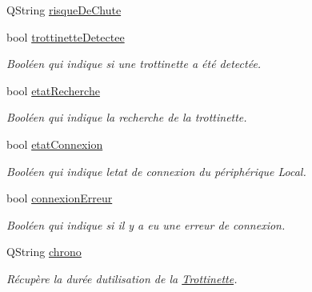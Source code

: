 \begin{DoxyCompactItemize}
Q\+String \hyperlink{class_peripherique_local_a79a43778c2db1c9c70784b6329dc383e}{risque\+De\+Chute}
\item 
bool \hyperlink{class_peripherique_local_af6f664b6af67f1c90eb017391ac812ed}{trottinette\+Detectee}
\begin{DoxyCompactList}\small\item\em Booléen qui indique si une trottinette a été detectée. \end{DoxyCompactList}\item 
bool \hyperlink{class_peripherique_local_a6638c29f6f75c3b4d329d93ae6ea4a48}{etat\+Recherche}
\begin{DoxyCompactList}\small\item\em Booléen qui indique la recherche de la trottinette. \end{DoxyCompactList}\item 
bool \hyperlink{class_peripherique_local_a5359e5a94b32b8a90c06ec999de13d2c}{etat\+Connexion}
\begin{DoxyCompactList}\small\item\em Booléen qui indique l\textquotesingle{}etat de connexion du périphérique Local. \end{DoxyCompactList}\item 
bool \hyperlink{class_peripherique_local_ad0e396b67eed256a7f27277ca7bfafdd}{connexion\+Erreur}
\begin{DoxyCompactList}\small\item\em Booléen qui indique si il y a eu une erreur de connexion. \end{DoxyCompactList}\item 
Q\+String \hyperlink{class_peripherique_local_a8b994159d5d56a45b693b191963d5053}{chrono}
\begin{DoxyCompactList}\small\item\em Récupère la durée d\textquotesingle{}utilisation de la \hyperlink{class_trottinette}{Trottinette}. \end{DoxyCompactList}\end{DoxyCompactItemize}
